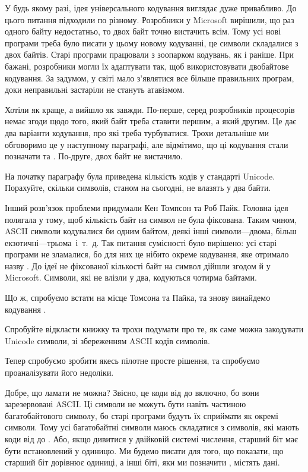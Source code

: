 У будь якому разі, ідея універсального кодування виглядає дуже привабливо.
До цього питання підходили по різному.
Розробники у Microsoft вирішили, що раз одного байту недостатньо, то двох байт точно вистачить всім.
Тому усі нові програми треба було писати у цьому новому кодуванні, це символи складалися з двох байтів.
Старі програми працювали з зоопарком кодувань, як і раніше.
При бажані, розробники могли їх адаптувати так, щоб використовувати двобайтове кодування.
За задумом, у світі мало з'являтися все більше правильних програм, доки неправильні застаріли не стануть атавізмом.

Хотіли як краще, а вийшло як завжди.
По-перше, серед розробників процесорів немає згоди щодо того, який байт треба ставити першим, а який другим.
Це дає два варіанти кодування, про які треба турбуватися.
Трохи детальніше ми обговоримо це у наступному параграфі, але відмітимо, що ці кодування стали позначати  та .
По-друге, двох байт не вистачило.

\begin{exercise}
На початку параграфу була приведена кількість кодів у стандарті Unicode.
Порахуйте, скільки символів, станом на сьогодні, не влазять у два байти.
\end{exercise}

Інший розв'язок проблеми придумали Кен Томпсон та Роб Пайк.
Головна ідея полягала у тому, щоб кількість байт на символ не була фіксована.
Таким чином, ASCII символи кодувалися би одним байтом, деякі інші символи---двома, більш екзотичні---трьома~і~т.~д.
Так питання сумісності було вирішено: усі старі програми не зламалися, бо для них це нібито окреме кодування, яке отримало назву .
До ідеї не фіксованої кількості байт на символ дійшли згодом й у Microsoft.
Символи, які не влізли у два, кодуються чотирма байтами.

Що ж, спробуємо встати на місце Томсона та Пайка, та знову винайдемо кодування .

\begin{exercise}
Спробуйте відкласти книжку та трохи подумати про те, як саме можна закодувати Unicode символи, зі збереженням ASCII кодів символів.
\end{exercise}

Тепер спробуємо зробити якесь пілотне просте рішення, та спробуємо проаналізувати його недоліки.

Добре, що ламати не можна?
Звісно, це коди від  до  включно, бо вони зарезервовані ASCII.
Ці символи не можуть бути навіть частиною багатобайтового символу, бо старі програми будуть їх сприймати як окремі символи.
Тому усі багатобайтні символи маюсь складатися з символів, які мають коди від  до .
Або, якщо дивитися у двійковій системі числення, старший біт має бути встановлений у одиницю.
Ми будемо писати  для того, що показати, що старший біт дорівнює одиниці, а інші біті, яки ми позначити , містять дані.


